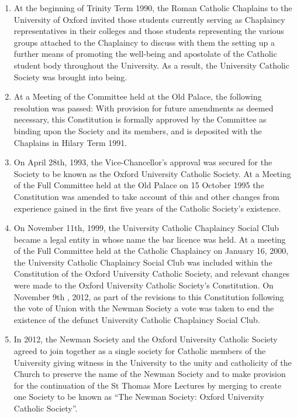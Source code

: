 \documentclass[11pt]{article}
\begin{document}
\begin{enumerate}
\begin{enumerate}
\item At the beginning of Trinity Term 1990, the Roman Catholic Chaplains to the University of Oxford invited those students currently serving as Chaplaincy representatives in their colleges and those students representing the various groups attached to the Chaplaincy to discuss with them the setting up a further means of promoting the well-being and apostolate of the Catholic student body throughout the University. As a result, the University Catholic Society was brought into being.
\item At a Meeting of the Committee held at the Old Palace, the following resolution was passed: With provision for future amendments as deemed necessary, this Constitution is formally approved by the Committee as binding upon the Society and its members, and is deposited with the Chaplains in Hilary Term 1991.
\item On April 28th, 1993, the Vice-Chancellor's approval was secured for the Society to be known as the Oxford University Catholic Society. At a Meeting of the Full Committee held at the Old Palace on 15 October 1995 the Constitution was amended to take account of this and other changes from experience gained in the first five years of the Catholic Society's existence.
\item On November 11th, 1999, the University Catholic Chaplaincy Social Club became a legal entity in whose name the bar licence was held. At a meeting of the Full Committee held at the Catholic Chaplaincy on January 16, 2000, the University Catholic Chaplaincy Social Club was included within the Constitution of the Oxford University Catholic Society, and relevant changes were made to the Oxford University Catholic Society's Constitution. On November 9th , 2012, as part of the revisions to this Constitution following the vote of Union with the Newman Society a vote was taken to end the existence of the defunct University Catholic Chaplaincy Social Club. 
\item In 2012, the Newman Society and the Oxford University Catholic Society agreed to join together as a single society for Catholic members of the University giving witness in the University to the unity and catholicity of the Church to preserve the name of the Newman Society and to make provision for the continuation of the St Thomas More Lectures by merging to create one Society to be known as ``The Newman Society: Oxford University Catholic Society''.
\end{enumerate}
\end{enumerate}
\end{document}
